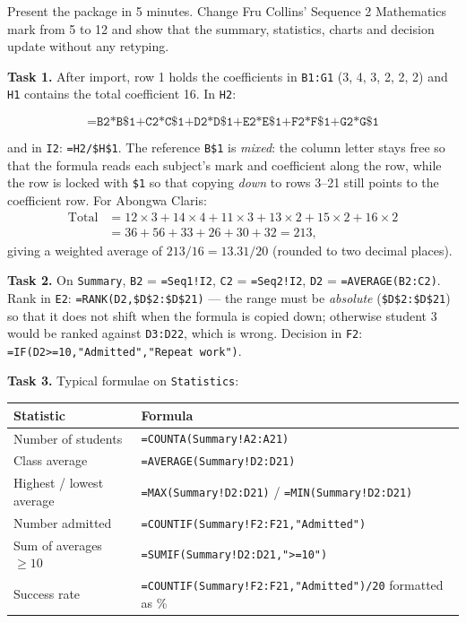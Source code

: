 \documentclass[11pt]{article}
\newcounter{popsec}
\newcounter{popsub}
\newcommand{\courssub}[1]{%
  \stepcounter{popsub}%
  \par\vspace{9pt}\noindent{\popxbold\fontsize{11.5}{13}\selectfont\color{popink}{\color{poporange}\thepopsec.\thepopsub}\hspace{6pt}#1}\par\nopagebreak\vspace{4pt}
}
\begin{document}
\begin{exercice}
Present the package in 5 minutes. Change Fru Collins' Sequence 2 Mathematics mark from 5 to 12 and show that the summary, statistics, charts and decision update without any retyping.
\end{exercice}

\courssub{Model answer}

\textbf{Task 1.} After import, row 1 holds the coefficients in \texttt{B1:G1} (3, 4, 3, 2, 2, 2) and \texttt{H1} contains the total coefficient 16. In \texttt{H2}:

\[ \texttt{=B2*B\$1+C2*C\$1+D2*D\$1+E2*E\$1+F2*F\$1+G2*G\$1} \]

and in \texttt{I2}: \texttt{=H2/\$H\$1}. The reference \texttt{B\$1} is \emph{mixed}: the column letter stays free so that the formula reads each subject's mark and coefficient along the row, while the row is locked with \texttt{\$1} so that copying \emph{down} to rows 3--21 still points to the coefficient row. For Abongwa Claris:
\begin{align*}
\text{Total} &= 12\times3+14\times4+11\times3+13\times2+15\times2+16\times2 \\
&= 36+56+33+26+30+32 = 213,
\end{align*}
giving a weighted average of $213/16 = 13.31/20$ (rounded to two decimal places).

\textbf{Task 2.} On \texttt{Summary}, \texttt{B2} = \texttt{=Seq1!I2}, \texttt{C2} = \texttt{=Seq2!I2}, \texttt{D2} = \texttt{=AVERAGE(B2:C2)}. Rank in \texttt{E2}: \texttt{=RANK(D2,\$D\$2:\$D\$21)} — the range must be \emph{absolute} (\texttt{\$D\$2:\$D\$21}) so that it does not shift when the formula is copied down; otherwise student 3 would be ranked against \texttt{D3:D22}, which is wrong. Decision in \texttt{F2}: \texttt{=IF(D2>=10,"Admitted","Repeat work")}.

\textbf{Task 3.} Typical formulae on \texttt{Statistics}:

\begin{center}
\begin{tabularx}{\linewidth}{|l|X|}
\hline
\rowcolor{popblueL} \textbf{Statistic} & \textbf{Formula} \\
\hline
Number of students & \texttt{=COUNTA(Summary!A2:A21)} \\
\hline
Class average & \texttt{=AVERAGE(Summary!D2:D21)} \\
\hline
Highest / lowest average & \texttt{=MAX(Summary!D2:D21)} / \texttt{=MIN(Summary!D2:D21)} \\
\hline
Number admitted & \texttt{=COUNTIF(Summary!F2:F21,"Admitted")} \\
\hline
Sum of averages $\geq 10$ & \texttt{=SUMIF(Summary!D2:D21,">=10")} \\
\hline
Success rate & \texttt{=COUNTIF(Summary!F2:F21,"Admitted")/20} formatted as \% \\
\hline
\end{tabularx}
\end{center}
\end{document}
